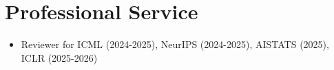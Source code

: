\documentclass[11pt,letterpaper,roman,colorlinks=true,urlcolor=brown]{moderncv}
\begin{document}
\section{Professional Service}
\begin{itemize}
    \item Reviewer for ICML (2024-2025), NeurIPS (2024-2025), AISTATS (2025), ICLR (2025-2026)
\end{itemize}
\end{document}
